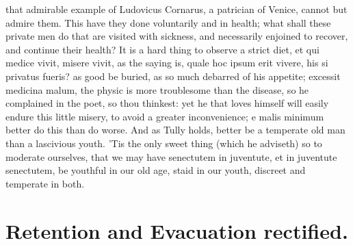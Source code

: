 {that admirable example of Ludovicus Cornarus, a patrician of
Venice, cannot but admire them. This have they done voluntarily and in
health; what shall these private men do that are visited with sickness,
and necessarily enjoined to recover, and continue their health?
It is a hard thing to observe a strict diet, et qui medice vivit,
misere vivit, as the saying is, quale hoc ipsum erit vivere, his
si privatus fueris? as good be buried, as so much debarred of his
appetite; excessit medicina malum, the physic is more troublesome than
the disease, so he complained in the poet, so thou thinkest: yet he
that loves himself will easily endure this little misery, to avoid a
greater inconvenience; e malis minimum better do this than do worse.
And as Tully holds, better be a temperate old man than a
lascivious youth. 'Tis the only sweet thing (which he adviseth) so to
moderate ourselves, that we may have senectutem in juventute, et in
juventute senectutem, be youthful in our old age, staid in our youth,
discreet and temperate in both.


\section{Retention and Evacuation rectified.}

}
